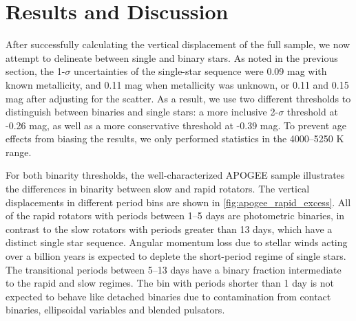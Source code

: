 \documentclass[manuscript]{aastex6}
\begin{document}
\section{Results and Discussion}
\label{sec:results}

After successfully calculating the vertical displacement of the full sample, we
now attempt to delineate between single and binary stars. As noted in the
previous section, the 1-\(\sigma\) uncertainties of the single-star sequence were 0.09 mag with 
known metallicity, and 0.11 mag when metallicity was unknown, or 0.11 and 0.15
mag after adjusting for the scatter. As a result, we use two
different thresholds to distinguish between binaries and single stars: a more
inclusive 2-\(\sigma\) threshold at -0.26 mag, as well as a more
conservative threshold at -0.39 mag. To prevent age effects from 
biasing the results, we only performed statistics in the 4000--5250 K 
range.

\begin{figure*}[htb]
    \centering
    \caption{\emph{Top Left to Bottom Right:} Vertical displacement of cool 
        APOGEE targets with \citet{McQuillan14} periods \(> 13\) days, between 
        \(5--13\) days, \(1--5\) days, and less than 1 day. Pink stars denote 
        eclipsing binaries with orbital periods within the same ranges. The 
        green and purple lines denote the inclusive and conservative 
        photometric binary thresholds, 
    respectively.}\label{fig:apogee_rapid_excess}
\end{figure*}

For both binarity thresholds, the well-characterized APOGEE sample 
illustrates the differences in binarity between slow and rapid rotators. The
vertical displacements in different period bins are shown in
\cref{fig:apogee_rapid_excess}. All of the rapid rotators with periods between
1--5 days are photometric binaries, in contrast to the slow rotators
with periods greater than 13 days, which have a distinct single star sequence. 
Angular momentum loss due to stellar winds acting over a billion years is
expected to deplete the short-period regime of single stars. The transitional 
periods between 5--13 days have a binary fraction intermediate to the 
rapid and slow regimes. The bin with periods shorter than 1 day is not expected
to behave like detached binaries due to contamination from contact binaries,
ellipsoidal variables and blended pulsators. 
\end{document}
